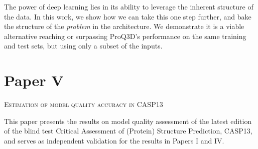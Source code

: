 \noindent
The power of deep learning lies in its ability to leverage the inherent structure of the data.
In this work, we show how we can take this one step further, and bake the structure of the \emph{problem} in the architecture.
We demonstrate it is a viable alternative reaching or surpassing ProQ3D's performance on the same training and test sets, but using only a subset of the inputs.

\section*{Paper V}
\begin{center}
	\textsc{Estimation of model quality accuracy in CASP13}
\end{center}

\noindent
This paper presents the results on model quality assessment of the latest edition of the blind test Critical Assessment of (Protein) Structure Prediction, CASP13,
and serves as independent validation for the results in Papers I and IV.

